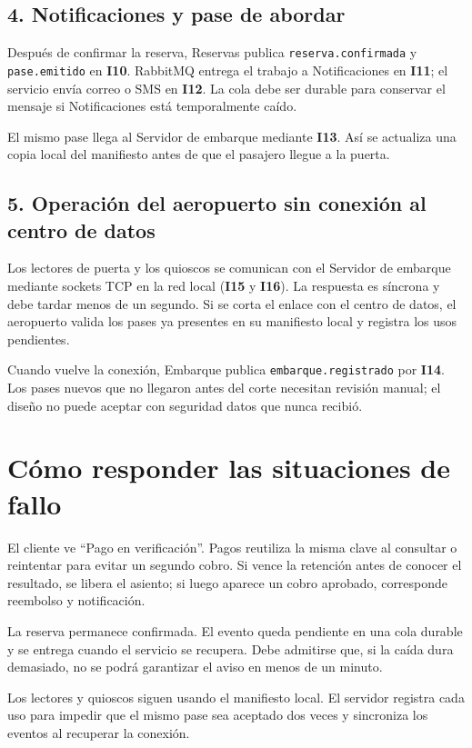 \documentclass[11pt,a4paper]{article}
\newcommand{\interaccion}[1]{\textbf{I#1}}
\begin{document}
\subsection*{4. Notificaciones y pase de abordar}

Después de confirmar la reserva, Reservas publica \texttt{reserva.confirmada} y \texttt{pase.emitido} en \interaccion{10}. RabbitMQ entrega el trabajo a Notificaciones en \interaccion{11}; el servicio envía correo o SMS en \interaccion{12}. La cola debe ser durable para conservar el mensaje si Notificaciones está temporalmente caído.

El mismo pase llega al Servidor de embarque mediante \interaccion{13}. Así se actualiza una copia local del manifiesto antes de que el pasajero llegue a la puerta.

\subsection*{5. Operación del aeropuerto sin conexión al centro de datos}

Los lectores de puerta y los quioscos se comunican con el Servidor de embarque mediante sockets TCP en la red local (\interaccion{15} y \interaccion{16}). La respuesta es síncrona y debe tardar menos de un segundo. Si se corta el enlace con el centro de datos, el aeropuerto valida los pases ya presentes en su manifiesto local y registra los usos pendientes.

Cuando vuelve la conexión, Embarque publica \texttt{embarque.registrado} por \interaccion{14}. Los pases nuevos que no llegaron antes del corte necesitan revisión manual; el diseño no puede aceptar con seguridad datos que nunca recibió.

\section*{Cómo responder las situaciones de fallo}

\begin{description}[leftmargin=0pt,style=nextline,itemsep=5pt]
  \item[F1. La pasarela no responde.] El cliente ve ``Pago en verificación''. Pagos reutiliza la misma clave al consultar o reintentar para evitar un segundo cobro. Si vence la retención antes de conocer el resultado, se libera el asiento; si luego aparece un cobro aprobado, corresponde reembolso y notificación.
  \item[F2. Notificaciones está caído.] La reserva permanece confirmada. El evento queda pendiente en una cola durable y se entrega cuando el servicio se recupera. Debe admitirse que, si la caída dura demasiado, no se podrá garantizar el aviso en menos de un minuto.
  \item[F3. Se pierde el enlace con el aeropuerto.] Los lectores y quioscos siguen usando el manifiesto local. El servidor registra cada uso para impedir que el mismo pase sea aceptado dos veces y sincroniza los eventos al recuperar la conexión.
\end{description}
\end{document}

